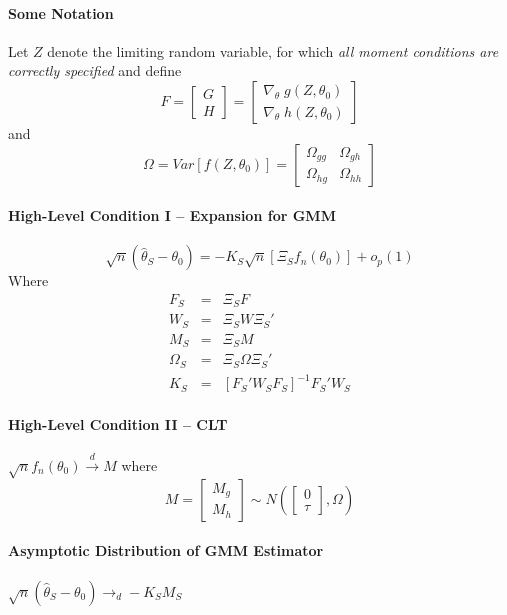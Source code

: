 \paragraph{Some Notation}
	Let $Z$ denote the limiting random variable, for which \emph{all moment conditions are correctly specified} and define
	$$F = \left[\begin{array}
	{c} G \\ H
\end{array} \right] = \left[ \begin{array}
	{c} \nabla_{\theta} \; g(Z,\theta_0) \\ \nabla_{\theta} \; h(Z,\theta_0)
\end{array}\right]$$
and
	$$\Omega = Var\left[ f(Z,\theta_0) \right] = \left[\begin{array}
		{cc}
		\Omega_{gg} & \Omega_{gh}\\
		\Omega_{hg} & \Omega_{hh}
	\end{array} \right]$$


\paragraph{High-Level Condition I -- Expansion for GMM}
$$\sqrt{n}\left(\widehat{\theta}_S - \theta_0\right) = -K_S\sqrt{n}\left[\Xi_S f_n(\theta_0)\right] + o_p(1)$$
Where
	\begin{eqnarray*}
	 	F_S &=& \Xi_S F\\
	 	W_S &=& \Xi_S W\Xi_S'\\
	 	M_S &=& \Xi_S M\\
	 	\Omega_S &=& \Xi_S \Omega\Xi_S'\\
	 	K_S  &=& [F_S'W_SF_S]^{-1} F_S'W_S
	 \end{eqnarray*} 



\paragraph{High-Level Condition II -- CLT} $\sqrt{n}f_n(\theta_0) \overset{d}{\rightarrow}M$ where
	$$M = \left[\begin{array}{c} M_g \\ M_h\end{array} \right] \sim N\left( \left[\begin{array}{c}0\\ \tau \end{array} \right], \Omega \right)$$

\paragraph{Asymptotic Distribution of GMM Estimator} $\sqrt{n}(\widehat{\theta}_S - \theta_0 ) \rightarrow_d-K_S  M_S$

